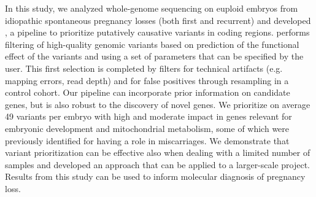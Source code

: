 In this study, we analyzed whole-genome sequencing on euploid embryos from idiopathic spontaneous pregnancy losses (both first and recurrent) and developed \gp, a pipeline to prioritize putatively causative variants in coding regions. \gp performs filtering of high-quality genomic variants based on prediction of the functional effect of the variants and using a set of parameters that can be specified by the user. This first selection is completed by filters for technical artifacts (e.g. mapping errors, read depth) and for false positives through resampling in a control cohort. Our pipeline can incorporate prior information on candidate genes, but is also robust to the discovery of novel genes.  %
We prioritize on average 49 variants per embryo with high and moderate impact in genes relevant for embryonic development and mitochondrial metabolism, some of which were previously identified for having a role in miscarriages. We demonstrate that variant prioritization can be effective also when dealing with a limited number of samples and developed an approach that can be applied to a larger-scale project. Results from this study can be used to inform molecular diagnosis of pregnancy loss. 





